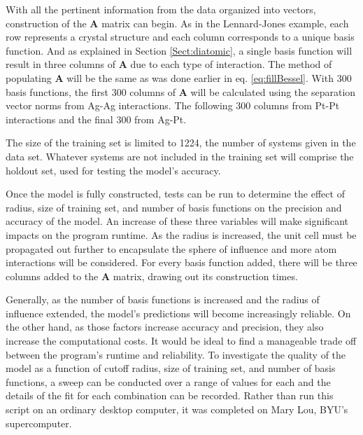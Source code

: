 \par With all the pertinent information from the data organized into vectors, construction of the $\mathbf{A}$ matrix can begin. As in the Lennard-Jones example, each row represents a crystal structure and each column corresponds to a unique basis function. And as explained in Section \ref{Sect:diatomic}, a single basis function will result in three columns of $\mathbf{A}$ due to each type of interaction. The method of populating $\mathbf{A}$ will be the same as was done earlier in eq. \ref{eq:fillBessel}. With 300 basis functions, the first 300 columns of $\mathbf{A}$ will be calculated using the separation vector norms from Ag-Ag interactions. The following 300 columns from Pt-Pt interactions and the final 300 from Ag-Pt.
\par The size of the training set is limited to 1224, the number of systems given in the data set. Whatever systems are not included in the training set will comprise the holdout set, used for testing the model's accuracy.
\par Once the model is fully constructed, tests can be run to determine the effect of radius, size of training set, and number of basis functions on the precision and accuracy of the model. An increase of these three variables will make significant impacts on the program runtime. As the radius is increased, the unit cell must be propagated out further to encapsulate the sphere of influence and more atom interactions will be considered. For every basis function added, there will be three columns added to the $\mathbf{A}$ matrix, drawing out its construction times. 
\par Generally, as the number of basis functions is increased and the radius of influence extended, the model's predictions will become increasingly reliable. On the other hand, as those factors increase accuracy and precision, they also increase the computational costs. It would be ideal to find a manageable trade off between the program's runtime and reliability. To investigate the quality of the model as a function of cutoff radius, size of training set, and number of basis functions, a sweep can be conducted over a range of values for each and the details of the fit for each combination can be recorded. Rather than run this script on an ordinary desktop computer, it was completed on Mary Lou, BYU's supercomputer. 
